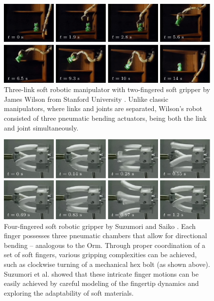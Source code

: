 \begin{figure}[!t]
  \vspace{-2mm}
  \centering
  \includegraphics*[width=\textwidth]{./pdf/thesis-figure-2-6.pdf}
  \caption{Three-link soft robotic manipulator with two-fingered soft gripper by James Wilson from Stanford University \cite{Wilson2007}. Unlike classic manipulators, where links and joints are separated, Wilson's robot consisted of three pneumatic bending actuators, being both the link and joint simultaneously.
  \vspace{-1mm}
  \label{fig:C0:fist_srm_robot}}
\end{figure}

\begin{figure}[!t]
  \vspace{-0mm}
  \includegraphics*[width=\textwidth]{./pdf/thesis-figure-2-7.pdf}
  \caption{Four-fingered soft robotic gripper by Suzumori and Saiko \cite{Suzumori1991,Suzumori1992}. Each finger possesses three pneumatic chambers that allow for directional bending -- analogous to the Orm. Through proper coordination of a set of soft fingers, various gripping complexities can be achieved, such as clockwise turning of a mechanical hex bolt (as shown above). Suzumori et al. showed that these intricate finger motions can be easily achieved by careful modeling of the fingertip dynamics and exploring the adaptability of soft materials.
  \label{fig:C0:fist_grip_robot}}
  \vspace{-3mm}
\end{figure}

